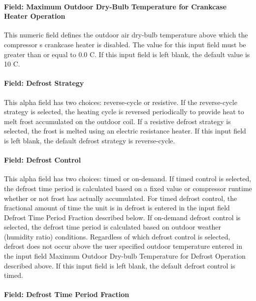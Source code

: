 \paragraph{Field: Maximum Outdoor Dry-Bulb Temperature for Crankcase Heater Operation}\label{field-maximum-outdoor-dry-bulb-temperature-for-crankcase-heater-operation-4}

This numeric field defines the outdoor air dry-bulb temperature above which the compressor s crankcase heater is disabled. The value for this input field must be greater than or equal to 0.0 C. If this input field is left blank, the default value is 10 C.

\paragraph{Field: Defrost Strategy}\label{field-defrost-strategy}

This alpha field has two choices: reverse-cycle or resistive. If the reverse-cycle strategy is selected, the heating cycle is reversed periodically to provide heat to melt frost accumulated on the outdoor coil. If a resistive defrost strategy is selected, the frost is melted using an electric resistance heater. If this input field is left blank, the default defrost strategy is reverse-cycle.

\paragraph{Field: Defrost Control}\label{field-defrost-control}

This alpha field has two choices: timed or on-demand. If timed control is selected, the defrost time period is calculated based on a fixed value or compressor runtime whether or not frost has actually accumulated. For timed defrost control, the fractional amount of time the unit is in defrost is entered in the input field Defrost Time Period Fraction described below. If on-demand defrost control is selected, the defrost time period is calculated based on outdoor weather (humidity ratio) conditions. Regardless of which defrost control is selected, defrost does not occur above the user specified outdoor temperature entered in the input field Maximum Outdoor Dry-bulb Temperature for Defrost Operation described above. If this input field is left blank, the default defrost control is timed.

\paragraph{Field: Defrost Time Period Fraction}\label{field-defrost-time-period-fraction}

